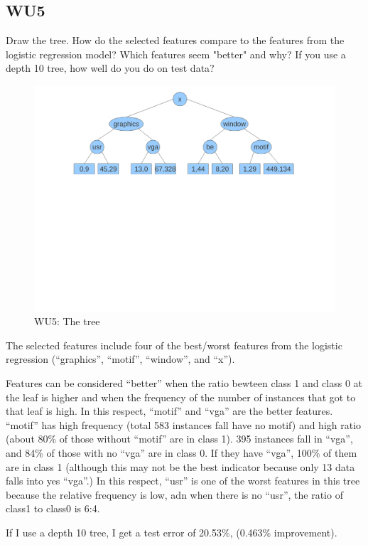 \documentclass[a4paper,11pt]{article}
\begin{document}
\subsection{WU5}
\textsf{ Draw the tree. How do the selected features compare to the
  features from the logistic regression model? Which features seem
  "better" and why? If you use a depth 10 tree, how well do you do on
  test data?}\\
\begin{figure}[h!]
  \caption{WU5: The tree}
  \centering
   \includegraphics[width=5in]{wu5_tree.pdf}
\end{figure}

The selected features include four of the best/worst features from
the logistic regression (``graphics'', ``motif'', ``window'', and ``x'').

Features can be considered ``better'' when the ratio bewteen class 1
and class 0 at the leaf is higher and when the frequency of the number
of instances that got to that leaf is high. In this respect, ``motif''
and ``vga'' are the better features. ``motif'' has high frequency
(total 583 instances fall have no motif) and high ratio (about 80\% of
those without ``motif'' are in class 1).  395 instances fall in
``vga'', and 84\% of those with no ``vga'' are in class 0. If they
have ``vga'', 100\% of them are in class 1 (although this may not be the
best indicator because only 13 data falls into yes ``vga''.) 
In this respect, ``usr'' is one of the worst features in this tree
because the relative frequency is low, adn when there is no ``usr'',
the ratio of class1 to class0 is 6:4.

If I use a depth 10 tree, I get a test error of 20.53\%, (0.463\%
improvement).
\end{document}
